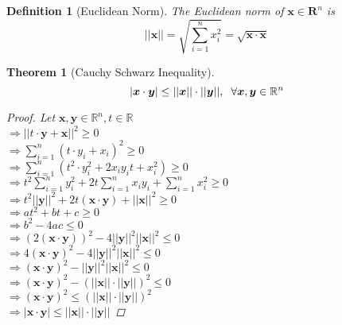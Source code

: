 \documentclass{article}
\newtheorem{definition}{Definition}[section]
\newtheorem{theorem}{Theorem}[section]
\begin{document}
			\begin{definition}[Euclidean Norm]
				The Euclidean norm of $\bm{x} \in \mathbf{R}^n$ is $$||\bm{x}|| = \sqrt{\sum\limits_{i=1}^n x_i^2} = \sqrt{\bm{x} \cdot \bm{x}}$$
			\end{definition}

			\begin{theorem}[Cauchy Schwarz Inequality]
			\label{cauchy-schwarz}
				$$|\bm{x}\cdot\bm{y}| \leq ||\bm{x}||\cdot||\bm{y}||, \hspace{2 mm} \forall \bm{x}, \bm{y} \in \mathbb{R}^n$$
			\begin{proof}
				Let $\bm{x}, \bm{y} \in \mathbb{R}^n, t \in \mathbb{R}$\\
					$\Rightarrow ||t \cdot \bm{y} + \bm{x}||^2 \geq 0$\\
					$\Rightarrow \sum\limits_{i=1}^n {(t \cdot y_i + x_i)}^2 \geq 0$\\
					$\Rightarrow \sum\limits_{i=1}^n (t^2 \cdot y_i^2 + 2x_i y_i t+x_i^2) \geq 0$\\
					$\Rightarrow t^2 \sum\limits_{i=1}^n y_i^2 + 2t \sum\limits_{i=1}^n x_i y_i + \sum\limits_{i=1}^n x_i^2 \geq 0$\\
					$\Rightarrow t^2 ||\bm{y}||^2 + 2t (\bm{x}\cdot\bm{y}) + ||\bm{x}||^2 \geq 0$\\
					$\Rightarrow a t^2+bt+c \geq 0$\\
					$\Rightarrow b^2-4ac \le 0$\\
					$\Rightarrow (2(\bm{x}\cdot\bm{y}))^2 - 4||\bm{y}||^2 ||\bm{x}||^2 \leq 0$\\
					$\Rightarrow 4(\bm{x}\cdot\bm{y})^2 - 4||\bm{y}||^2 ||\bm{x}||^2 \leq 0$\\
					$\Rightarrow (\bm{x}\cdot\bm{y})^2 - ||\bm{y}||^2 ||\bm{x}||^2 \leq 0$\\
					$\Rightarrow (\bm{x}\cdot\bm{y})^2 - (||\bm{x}|| \cdot ||\bm{y}||)^2 \leq 0$\\
					$\Rightarrow (\bm{x}\cdot\bm{y})^2 \leq (||\bm{x}|| \cdot ||\bm{y}||)^2$\\
					$\Rightarrow |\bm{x}\cdot\bm{y}| \leq ||\bm{x}|| \cdot ||\bm{y}||$
			\end{proof}
			\end{theorem}
\end{document}
